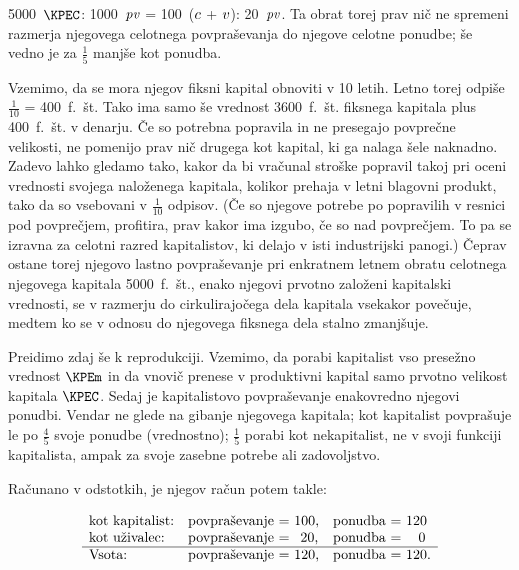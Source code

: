 \documentclass[kapital_02.tex]{subfiles}
\begin{document}
5000~\( \KPEC \): 1000~\( \mathit{pv} \) = 100~(\( c \) + \( v \)): 20~\( \mathit{pv} \). Ta obrat torej prav nič ne spremeni razmerja njegovega celotnega povpraševanja do njegove celotne ponudbe; še vedno je za $\frac{1}{5}$ manjše kot ponudba.

Vzemimo, da se mora njegov fiksni kapital obnoviti v 10 letih. Letno torej odpiše $\frac{1}{10}$ = 400\ f.\ št. Tako ima samo še vrednost 3600\ f.\ št. fiksnega kapitala plus 400\ f.\ št. v denarju. Če so potrebna popravila in ne presegajo povprečne velikosti, ne pomenijo prav nič drugega kot kapital, ki ga nalaga \KPEstran šele naknadno. Zadevo lahko gledamo tako, kakor da bi vračunal stroške popravil takoj pri oceni vrednosti svojega naloženega kapitala, kolikor prehaja v letni blagovni produkt, tako da so vsebovani v $\frac{1}{10}$ odpisov. (Če so njegove potrebe po popravilih v resnici pod povprečjem, profitira, prav kakor ima izgubo, če so nad povprečjem. To pa se izravna za celotni razred kapitalistov, ki delajo v isti industrijski panogi.) Čeprav ostane torej njegovo lastno povpraševanje pri enkratnem letnem obratu celotnega njegovega kapitala 5000\ f.\ št., enako njegovi prvotno založeni kapitalski vrednosti, se v razmerju do cirkulirajočega dela kapitala vsekakor povečuje, medtem ko se v odnosu do njegovega fiksnega dela stalno zmanjšuje.

Preidimo zdaj še k reprodukciji. Vzemimo, da porabi kapitalist vso presežno vrednost \( \KPEm \) in da vnovič prenese v produktivni kapital samo prvotno velikost kapitala \( \KPEC \). Sedaj je kapitalistovo povpraševanje enakovredno njegovi ponudbi. Vendar ne glede na gibanje njegovega kapitala; kot kapitalist povprašuje le po $\frac{4}{5}$ svoje ponudbe (vrednostno); $\frac{1}{5}$ porabi kot nekapitalist, ne v svoji funkciji kapitalista, ampak za svoje zasebne potrebe ali zadovoljstvo.

Računano v odstotkih, je njegov račun potem takle:

\[
    \begin{array}{l l l}
        \textrm{kot kapitalist:} & \textrm{povpraševanje = 100,} & \textrm{ponudba = 120} \\
        \textrm{kot uživalec:} & \textrm{povpraševanje =} \phantom{.} \thinspace \thinspace \thinspace \textrm{20,} & \textrm{ponudba =} \phantom{-.} \thinspace \textrm{0} \\
        \hline
        \textrm{Vsota:} & \textrm{povpraševanje = 120,} & \textrm{ponudba = 120.} \\
    \end{array}
\]
\end{document}
